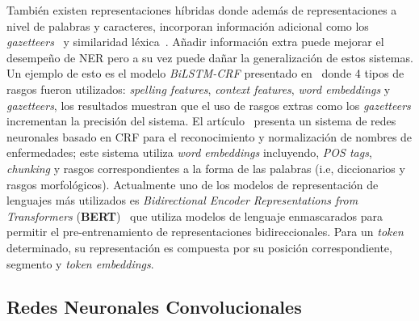 Tambi\'en existen representaciones h\'ibridas donde adem\'as de representaciones a nivel de palabras y caracteres, incorporan informaci\'on adicional como los \emph{gazetteers}~\cite{huang2015bidirectional} y similaridad l\'exica~\cite{ghaddar2018robust}. A\~nadir informaci\'on extra puede mejorar el desempe\~no de NER pero a su vez puede da\~nar la generalizaci\'on de estos sistemas. Un ejemplo de esto es el modelo \emph{BiLSTM-CRF} presentado en~\cite{huang2015bidirectional} donde 4 tipos de rasgos fueron utilizados: \emph{spelling features}, \emph{context features}, \emph{word embeddings} y \emph{gazetteers}, los resultados muestran que el uso de rasgos extras como los \emph{gazetteers} incrementan la precisi\'on del sistema. El art\'iculo~\cite{wei2016disease} presenta un sistema de redes neuronales basado en CRF para el reconocimiento y normalizaci\'on de nombres de enfermedades; este sistema utiliza \emph{word embeddings} incluyendo, \emph{POS tags}, \emph{chunking} y rasgos correspondientes a la forma de las palabras (i.e, diccionarios y rasgos morfol\'ogicos). Actualmente uno de los modelos de representaci\'on de lenguajes m\'as utilizados es \emph{Bidirectional Encoder Representations from Transformers} (\textbf{BERT})~\cite{devlin2018bert} que utiliza modelos de lenguaje enmascarados para permitir el pre-entrenamiento de representaciones bidireccionales. Para un \emph{token} determinado, su representaci\'on es compuesta por su posici\'on correspondiente, segmento y \emph{token embeddings}.


\subsection{Redes Neuronales Convolucionales}
%

